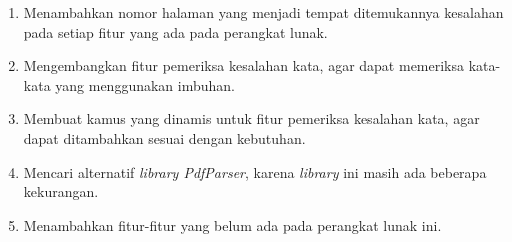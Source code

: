 \begin{enumerate}
	\item Menambahkan nomor halaman yang menjadi tempat ditemukannya kesalahan pada setiap fitur yang ada pada perangkat lunak.
		
	\item Mengembangkan fitur pemeriksa kesalahan kata, agar dapat memeriksa kata-kata yang menggunakan imbuhan.
	
	\item Membuat kamus yang dinamis untuk fitur pemeriksa kesalahan kata, agar dapat ditambahkan sesuai dengan kebutuhan.
	
	\item Mencari alternatif \textit{library PdfParser}, karena \textit{library} ini masih ada beberapa kekurangan.
	
	\item Menambahkan fitur-fitur yang belum ada pada perangkat lunak ini.
\end{enumerate}